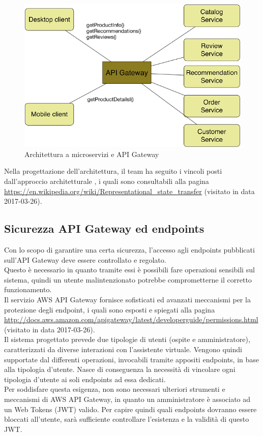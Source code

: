 \begin{figure}[h]
	\centering
	\includegraphics[width=\textwidth,height=\textheight,keepaspectratio,scale=0.1]{images/apigateway1.png}
	\caption{Architettura a microservizi e API Gateway}\label{fig:apig1}
\end{figure}
\newpage
Nella progettazione dell'architettura, il team ha seguito i vincoli posti dall'approccio architetturale , i quali sono consultabili alla pagina \url{https://en.wikipedia.org/wiki/Representational_state_transfer} (visitato in data 2017-03-26).
\subsection{Sicurezza API Gateway ed endpoints}
Con lo scopo di garantire una certa sicurezza, l'accesso agli endpoints pubblicati sull'API Gateway deve essere controllato e regolato. \\Questo è necessario in quanto tramite essi è possibili fare operazioni sensibili sul sistema, quindi un utente malintenzionato potrebbe comprometterne il corretto funzionamento.\\
Il servizio AWS API Gateway fornisce sofisticati ed avanzati meccanismi per la protezione degli endpoint, i quali sono esposti e spiegati alla pagina \url{http://docs.aws.amazon.com/apigateway/latest/developerguide/permissions.html} (visitato in data 2017-03-26). \\

Il sistema progettato prevede due tipologie di utenti (ospite e amministratore), caratterizzati da diverse interazioni con l'assistente virtuale. Vengono quindi supportate dal  differenti operazioni, invocabili tramite appositi endpoints, in base alla tipologia d'utente. Nasce di conseguenza la necessità di vincolare ogni tipologia d'utente ai soli endpoints ad essa dedicati. \\
Per soddisfare questa esigenza, non sono necessari ulteriori strumenti e meccanismi di AWS API Gateway, in quanto un amministratore è associato ad un  Web Tokens (JWT) valido. Per capire quindi quali endpoints dovranno essere bloccati all'utente, sarà sufficiente controllare l'esistenza e la validità di questo JWT.

